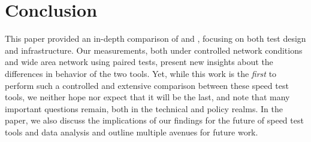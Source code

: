 \section{Conclusion}\label{sec:conclusion}

This paper provided an in-depth comparison of \ookla and \ndt, focusing on
both test design and infrastructure. Our measurements, both under controlled
network conditions and wide area network using paired tests, present new
insights about the differences in behavior of the two tools. Yet, while this
work is the {\em first} to perform such a controlled and extensive comparison
between these speed test tools, we neither hope nor expect that it will be the
last, and note that many important questions remain, both in the technical and policy
realms.  In the paper, we also discuss the implications of our findings for the future of
speed test tools and data analysis and outline multiple avenues for
future work. 


